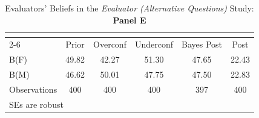 \begin{table}[htbp]\centering
\caption{Evaluators' Beliefs in the \textit{Evaluator (Alternative Questions)} Study: \textbf{Panel E}}
\begin{tabular}{l*{5}{c}}
\hline\hline
                &\multicolumn{5}{c}{}                             \\\cmidrule(lr){2-6}
                &\multicolumn{1}{c}{Prior}&\multicolumn{1}{c}{Overconf}&\multicolumn{1}{c}{Underconf}&\multicolumn{1}{c}{Bayes Post}&\multicolumn{1}{c}{Post}\\
\hline
B(F)            &    49.82&    42.27&    51.30&    47.65&    22.43\\
B(M)            &    46.62&    50.01&    47.75&    47.50&    22.83\\
\hline
Observations    &      400&      400&      400&      397&      400\\
\hline\hline
\multicolumn{6}{l}{\footnotesize SEs are robust}\\
\end{tabular}
\end{table}
